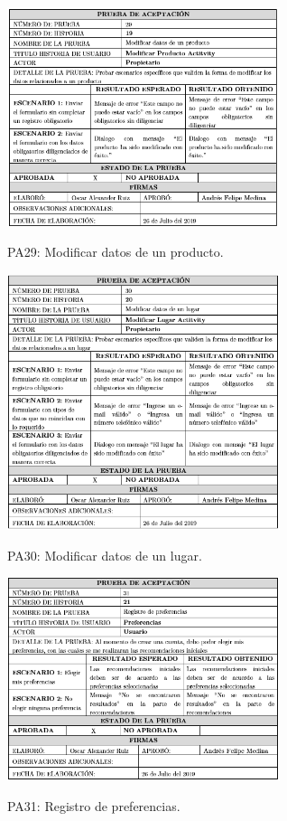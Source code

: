 \documentclass[12pt,letterpaper,openany]{book}
\begin{document}
\begin{table}[H]
\centering
\includegraphics[width=8cm]{./imagenes/PA/PA29}
\caption{PA29: Modificar datos de un producto.}
\end{table}

\begin{table}[H]
\centering
\includegraphics[width=8cm]{./imagenes/PA/PA30}
\caption{PA30: Modificar datos de un lugar.}
\end{table}

\begin{table}[H]
\centering
\includegraphics[width=8cm]{./imagenes/PA/PA31}
\caption{PA31: Registro de preferencias.}
\end{table}
\end{document}
